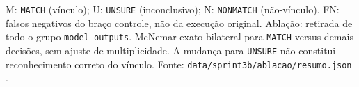 \begin{table}[!ht]
\centering
\footnotesize
\caption{Ablação conjunta das saídas do motor no dossiê de revisão, em 18 vínculos verdadeiros selecionados por falso negativo compartilhado no modo vigilância.}
\label{tab:cap8-ablacao-dossie}
\par\smallskip
\parbox{\linewidth}{\footnotesize M: \texttt{MATCH} (vínculo); U: \texttt{UNSURE} (inconclusivo); N: \texttt{NONMATCH} (não-vínculo). FN: falsos negativos do braço controle, não da execução original. Ablação: retirada de todo o grupo \texttt{model\_outputs}. McNemar exato bilateral para \texttt{MATCH} versus demais decisões, sem ajuste de multiplicidade. A mudança para \texttt{UNSURE} não constitui reconhecimento correto do vínculo. Fonte: \texttt{data/sprint3b/ablacao/resumo.json} \cite{Jardim2026phdrepo}.}
\end{table}
